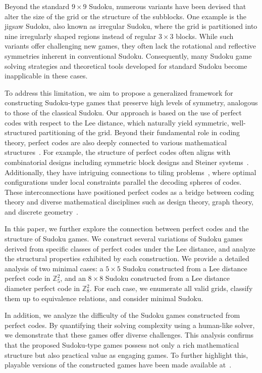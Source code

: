 \documentclass{article}
\theoremstyle{definition}
\begin{document}
Beyond the standard $9 \times 9$ Sudoku, numerous variants have been devised that alter the size of the grid or the structure of the subblocks. One example is the jigsaw Sudoku, also known as irregular Sudoku, where the grid is partitioned into nine irregularly shaped regions instead of regular $3 \times 3$ blocks. While such variants offer challenging new games, they often lack the rotational and reflective symmetries inherent in conventional Sudoku. Consequently, many Sudoku game solving strategies and theoretical tools developed for standard Sudoku become inapplicable in these cases.

To address this limitation, we aim to propose a generalized framework for constructing Sudoku-type games that preserve high levels of symmetry, analogous to those of the classical Sudoku. Our approach is based on the use of perfect codes with respect to the Lee distance, which naturally yield symmetric, well-structured partitioning of the grid. Beyond their fundamental role in coding theory, perfect codes are also deeply connected to various mathematical structures~\cite{E22}. For example, the structure of perfect codes often aligns with combinatorial designs including symmetric block designs and Steiner systems~\cite{CL75}. Additionally, they have intriguing connections to tiling problems~\cite{EV98, K23}, where optimal configurations under local constraints parallel the decoding spheres of codes. These interconnections have positioned perfect codes as a bridge between coding theory and diverse mathematical disciplines such as design theory, graph theory, and discrete geometry~\cite{CL75}.

In this paper, we further explore the connection between perfect codes and the structure of Sudoku games. We construct several variations of Sudoku games derived from specific classes of perfect codes under the Lee distance, and analyze the structural properties exhibited by each construction.
We provide a detailed analysis of two minimal cases: a $5 \times 5$ Sudoku constructed from a Lee distance perfect code in $\mathbb{Z}_5^2$, and an $8 \times 8$ Sudoku constructed from a Lee distance diameter perfect code in $\mathbb{Z}_8^2$. For each case, we enumerate all valid grids, classify them up to equivalence relations, and consider minimal Sudoku.

In addition, we analyze the difficulty of the Sudoku games constructed from perfect codes. By quantifying their solving complexity using a human-like solver, we demonstrate that these games offer diverse challenges. This analysis confirms that the proposed Sudoku-type games possess not only a rich mathematical structure but also practical value as engaging games. To further highlight this, playable versions of the constructed games have been made available at~\cite{KB25}.
\end{document}
